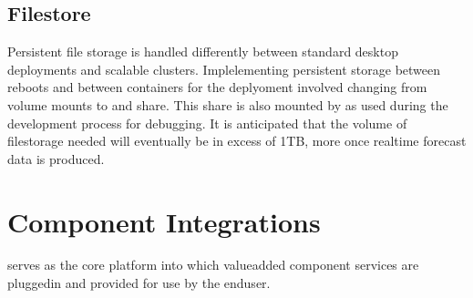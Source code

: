 \documentclass[letterpaper,12pt,english,openany,oneside]{sphinxmanual}
\begin{document}
\section{Filestore}
\label{\detokenize{euidev/infrastructure/index:filestore}}
\sphinxAtStartPar
Persistent file storage is handled differently between standard  desktop deployments and scalable  clusters. Implelementing persistent storage between reboots and between containers for the  deplyoment involved changing from volume mounts to and  share. This  share is also mounted by as   used during the development process for debugging. It is anticipated that the volume of filestorage needed will eventually be in excess of 1TB, more once real\sphinxhyphen{}time forecast data is produced.

\sphinxstepscope


\chapter{Component Integrations}
\label{\detokenize{euidev/integrations/index:component-integrations}}\label{\detokenize{euidev/integrations/index::doc}}
\sphinxAtStartPar
{} serves as the core platform into which value\sphinxhyphen{}added component services are plugged\sphinxhyphen{}in and provided for use by the end\sphinxhyphen{}user.
\end{document}
